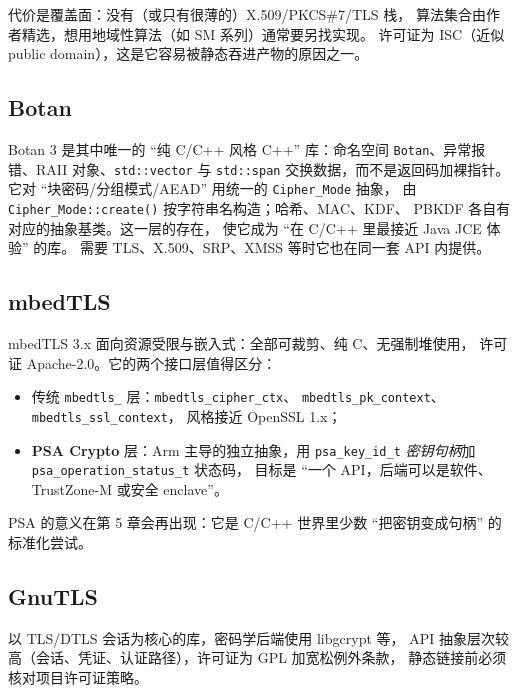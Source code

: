 \documentclass[12pt,a4paper,fontset=fandol]{ctexbook}
\newcommand{\Fn}[1]{\texttt{#1()}}
\newcommand{\Tp}[1]{\texttt{#1}}
\newcommand{\CppJava}{C/C++}
\begin{document}
代价是覆盖面：没有（或只有很薄的）X.509/PKCS\#7/TLS 栈，
算法集合由作者精选，想用地域性算法（如 SM 系列）通常要另找实现。
许可证为 ISC（近似 public domain），这是它容易被静态吞进产物的原因之一。

\subsection{Botan}

Botan 3 是其中唯一的 ``纯 \CppJava{} 风格 C++'' 库：命名空间
\Tp{Botan}、异常报错、RAII 对象、\Tp{std::vector} 与
\Tp{std::span} 交换数据，而不是返回码加裸指针。
它对 ``块密码/分组模式/AEAD'' 用统一的 \Tp{Cipher\_Mode} 抽象，
由 \Fn{Cipher\_Mode::create} 按字符串名构造；哈希、MAC、KDF、
PBKDF 各自有对应的抽象基类。这一层的存在，
使它成为 ``在 \CppJava{} 里最接近 Java JCE 体验'' 的库。
需要 TLS、X.509、SRP、XMSS 等时它也在同一套 API 内提供。

\subsection{mbedTLS}

mbedTLS 3.x 面向资源受限与嵌入式：全部可裁剪、纯 C、无强制堆使用，
许可证 Apache-2.0。它的两个接口层值得区分：

\begin{itemize}
  \item 传统 \Tp{mbedtls\_} 层：\Tp{mbedtls\_cipher\_\allowbreak ctx}、
        \Tp{mbedtls\_pk\_\allowbreak context}、
        \Tp{mbedtls\_ssl\_\allowbreak context}，
        风格接近 OpenSSL 1.x；
  \item \textbf{PSA Crypto} 层：Arm 主导的独立抽象，用
        \Tp{psa\_\allowbreak{}key\_\allowbreak{}id\_\allowbreak{}t} \emph{密钥句柄}加
        \Tp{psa\_\allowbreak{}operation\_\allowbreak{}status\_\allowbreak{}t} 状态码，
        目标是 ``一个 API，后端可以是软件、TrustZone-M 或安全 enclave''。
\end{itemize}

PSA 的意义在第 5 章会再出现：它是 \CppJava{} 世界里少数
``把密钥变成句柄'' 的标准化尝试。

\subsection{GnuTLS}

以 TLS/DTLS 会话为核心的库，密码学后端使用 libgcrypt 等，
API 抽象层次较高（会话、凭证、认证路径），许可证为 GPL 加宽松例外条款，
静态链接前必须核对项目许可证策略。
\end{document}
